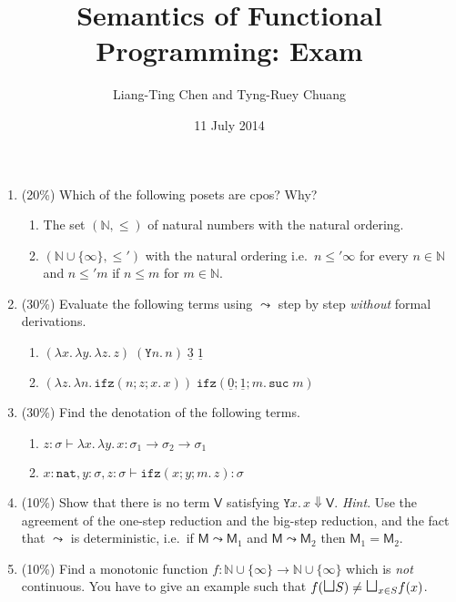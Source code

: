\documentclass{article}
\title{Semantics of Functional Programming: Exam}
\author{Liang-Ting Chen and Tyng-Ruey Chuang}
\date{11 July 2014}
\begin{document}
\maketitle

\begin{enumerate}
  \item (20\%) Which of the following posets are cpos? Why?
    \begin{enumerate}
      \item The set $(\mathbb{N}, \leq)$
        of natural numbers with the natural ordering. 
      \item $(\mathbb{N} \cup \{\infty\}, \leq')$ with the natural ordering
        i.e.\ $n \leq' \infty$ for every $n \in \mathbb{N}$
        and $n \leq' m$ if $n \leq m$ for $m \in \mathbb{N}$. 
    \end{enumerate}
  \item (30\%) Evaluate the following terms using $\leadsto$ step by step
    \emph{without} formal derivations.
    \begin{enumerate}
      \item $(\lambda x.\, \lambda y.\, \lambda z.\, z) \;(\mathtt{Y} n.\,
        n)\;\underline{3}\;\underline{1}$
      \item $\left(\lambda z.\,\lambda n.\,\mathtt{ifz}(n; z; x.\,x)\right)\;
        \mathtt{ifz}(\underline{0}; \underline{1}; m.\, \mathtt{suc}\;m)$
    \end{enumerate}
  \item (30\%) Find the denotation of the following terms.
    \begin{enumerate}
      \item $z : \sigma \vdash \lambda x.\,\lambda y.\, x : \sigma_1 \to
        \sigma_2 \to \sigma_1$
      \item $x : \mathtt{nat}, y : \sigma, z : \sigma \vdash
        \mathtt{ifz}(x; y; m.\, z) : \sigma$
    \end{enumerate}
  \item (10\%) Show that there is no term $\mathsf{V}$ satisfying
    $\mathtt{Y} x.\,x\Downarrow \mathsf{V}$.
    \textit{Hint}. Use the agreement of the one-step reduction and the big-step
    reduction, and the fact that $\leadsto$ is deterministic, i.e.\ 
    if $\mathsf{M} \leadsto \mathsf{M}_1$ and $\mathsf{M} \leadsto
    \mathsf{M}_2$ then $\mathsf{M}_1 = \mathsf{M}_2$. 
  \item (10\%) Find a monotonic function
    $f : \mathbb{N} \cup \{\infty\}  \to \mathbb{N} \cup \{\infty\}$
    which is \emph{not} continuous. You have to give an example
    such that $f({\mbox{\Large $\sqcup$}} S) \neq
    {\mbox{\Large $\sqcup$}}_{x \in S} f(x)$.
\end{enumerate}
\end{document}
